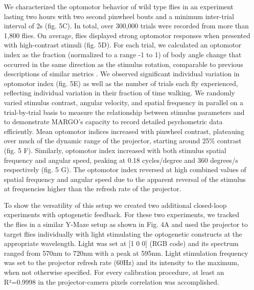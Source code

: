 \documentclass[10pt]{article}
\begin{document}
\begin{multicols}{2}
We characterized the optomotor behavior of wild type flies in an experiment lasting two hours with two second pinwheel bouts and a minimum inter-trial interval of 2s (fig. 5C). In total, over 300,000 trials were recorded from more than 1,800 flies. On average, flies displayed strong optomotor responses when presented with high-contrast stimuli (fig. 5D). For each trial, we calculated an optomotor index as the fraction (normalized to a range -1 to 1) of body angle change that occurred in the same direction as the stimulus rotation, comparable to previous descriptions of similar metrics \cite{Seelig_Two_2010}. We observed significant individual variation in optomotor index (fig. 5E) as well as the number of trials each fly experienced, reflecting individual variation in their fraction of time walking. We randomly varied stimulus contrast, angular velocity, and spatial frequency in parallel on a trial-by-trial basis to measure the relationship between stimulus parameters and to demonstrate MARGO's capacity to record detailed psychometric data efficiently. Mean optomotor indices increased with pinwheel contrast, plateauing over much of the dynamic range of the projector, starting around 25\% contrast (fig. 5 F). Similarly, optomotor index increased with both stimulus spatial frequency and angular speed, peaking at 0.18 cycles/degree and 360 degrees/s respectively (fig. 5 G). The optomotor index reversed at high combined values of spatial frequency and angular speed due to the apparent reversal of the stimulus at frequencies higher than the refresh rate of the projector.

To show the versatility of this setup we created two additional closed-loop experiments with optogenetic feedback. For these two experiments, we tracked the flies in a similar Y-Maze setup as shown in Fig. 4A and used the projector to target flies individually with light stimulating the optogenetic constructs at the appropriate wavelength. Light was set at [1 0 0] (RGB code) and its spectrum ranged from 570nm to 720nm with a peak at 595nm. Light stimulation frequency was set to the projector refresh rate (60Hz) and its intensity to the maximum, when not otherwise specified. For every calibration procedure, at least an R²=0.9998 in the projector-camera pixels correlation was accomplished.


\end{multicols}
\end{document}
